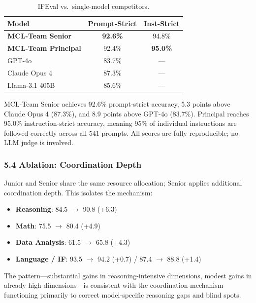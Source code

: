 \documentclass[
]{article}
\providecommand{\tightlist}{%
  \setlength{\itemsep}{0pt}\setlength{\parskip}{0pt}}
\begin{document}
\begin{table}[H]
\centering
\caption{IFEval vs.\ single-model competitors.}
\label{tab:ifeval-competitors}
\begin{tabular}{@{}lcc@{}}
\toprule
\textbf{Model} & \textbf{Prompt-Strict} & \textbf{Inst-Strict} \\
\midrule
\textbf{MCL-Team Senior} & \textbf{92.6\%} & 94.8\% \\
\textbf{MCL-Team Principal} & 92.4\% & \textbf{95.0\%} \\
\midrule
GPT-4o             & 83.7\% & --- \\
Claude Opus 4      & 87.3\% & --- \\
Llama-3.1 405B     & 85.6\% & --- \\
\bottomrule
\end{tabular}
\end{table}

MCL-Team Senior achieves 92.6\% prompt-strict accuracy, 5.3 points above Claude Opus 4 (87.3\%), and 8.9 points above GPT-4o (83.7\%). Principal reaches 95.0\% instruction-strict accuracy, meaning 95\% of individual instructions are followed correctly across all 541 prompts. All scores are fully reproducible; no LLM judge is involved.

\subsubsection{5.4 Ablation: Coordination Depth}\label{ablation}

Junior and Senior share the same resource allocation; Senior applies additional coordination depth. This isolates the mechanism:

\begin{itemize}
\tightlist
\item \textbf{Reasoning}: 84.5 $\rightarrow$ 90.8 (+6.3)
\item \textbf{Math}: 75.5 $\rightarrow$ 80.4 (+4.9)
\item \textbf{Data Analysis}: 61.5 $\rightarrow$ 65.8 (+4.3)
\item \textbf{Language / IF}: 93.5 $\rightarrow$ 94.2 (+0.7) / 87.4 $\rightarrow$ 88.8 (+1.4)
\end{itemize}

The pattern---substantial gains in reasoning-intensive dimensions, modest gains in already-high dimensions---is consistent with the coordination mechanism functioning primarily to correct model-specific reasoning gaps and blind spots.
\end{document}
